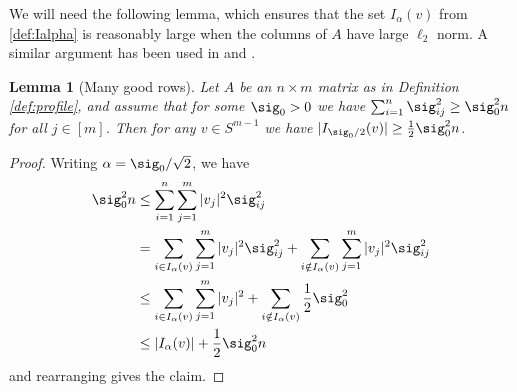 \documentclass[aop,preprint]{imsart}
\theoremstyle{plain}
\newtheorem{lemma}[theorem]{Lemma}
\theoremstyle{definition}
\theoremstyle{remark}
\numberwithin{equation}{section}
\numberwithin{theorem}{section}
\begin{document}
We will need the following lemma, which ensures that the set $I_\alpha(v)$ from \eqref{def:Ialpha} is reasonably large when the columns of $A$ have large $\ell_2$ norm.
A similar argument has been used in \citep{LiRi} and \citep{RuZe}.

\begin{lemma}[Many good rows]	\label{lem:goodrows0}
Let $A$ be an $n\times m$ matrix as in Definition \ref{def:profile}, and assume that for some $\sig_0>0$ we have $\sum_{i=1}^n \sig_{ij}^2\ge \sig_0^2 n$ for all $j\in [m]$.
Then for any $v\in S^{m-1}$ we have $|I_{\sig_0/2}(v)|\ge \frac12\sig_0^2n$.
\end{lemma}

\begin{proof}
Writing $\alpha=\sig_0/\sqrt{2}$, we have
\begin{align*}
\sig_0^2 n &\le \sum_{i=1}^n\sum_{j=1}^m |v_j|^2 \sig_{ij}^2\\
&=\sum_{i\in I_{\alpha}(v)}\sum_{j=1}^m |v_j|^2 \sig_{ij}^2 + \sum_{i\notin I_{\alpha}(v)}\sum_{j=1}^m |v_j|^2 \sig_{ij}^2\\
&\le \sum_{i\in I_{\alpha}(v)}\sum_{j=1}^m |v_j|^2 + \sum_{i\notin I_{\alpha}(v)} \frac{1}2\sig_0^2 \\
&\le |I_{\alpha}(v)| + \frac12 \sig_0^2n
\end{align*}
and rearranging gives the claim.
\end{proof}
\end{document}
